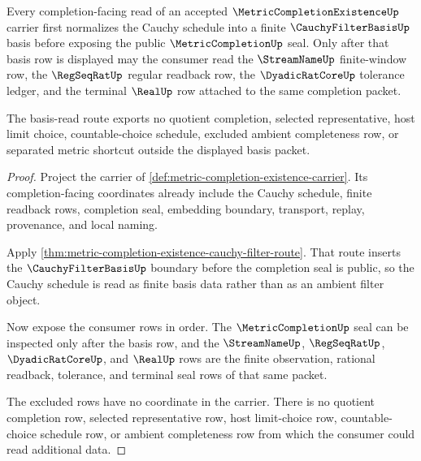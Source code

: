 \begin{theorem}
\label{thm:metric-completion-existence-cauchy-filter-basis-route}
Every completion-facing read of an accepted $\MetricCompletionExistenceUp$ carrier first normalizes the Cauchy schedule into a finite $\CauchyFilterBasisUp$ basis before exposing the public $\MetricCompletionUp$ seal. Only after that basis row is displayed may the consumer read the $\StreamNameUp$ finite-window row, the $\RegSeqRatUp$ regular readback row, the $\DyadicRatCoreUp$ tolerance ledger, and the terminal $\RealUp$ row attached to the same completion packet.

The basis-read route exports no quotient completion, selected representative, host limit choice, countable-choice schedule, excluded ambient completeness row, or separated metric shortcut outside the displayed basis packet.
\end{theorem}
\begin{proof}
Project the carrier of \autoref{def:metric-completion-existence-carrier}. Its completion-facing coordinates already include the Cauchy schedule, finite readback rows, completion seal, embedding boundary, transport, replay, provenance, and local naming.

Apply \autoref{thm:metric-completion-existence-cauchy-filter-route}. That route inserts the $\CauchyFilterBasisUp$ boundary before the completion seal is public, so the Cauchy schedule is read as finite basis data rather than as an ambient filter object.

Now expose the consumer rows in order. The $\MetricCompletionUp$ seal can be inspected only after the basis row, and the $\StreamNameUp$, $\RegSeqRatUp$, $\DyadicRatCoreUp$, and $\RealUp$ rows are the finite observation, rational readback, tolerance, and terminal seal rows of that same packet.

The excluded rows have no coordinate in the carrier. There is no quotient completion row, selected representative row, host limit-choice row, countable-choice schedule row, or ambient completeness row from which the consumer could read additional data.
\end{proof}
